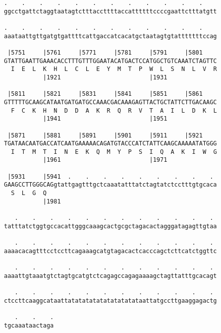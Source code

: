 \documentclass{article}
\begin{document}
\begin{Verbatim}
.    .    .    .    .    .    .    .    .    .    .    .    
ggcctgattctaggtaatagtctttaccttttaccattttttccccgaattctttatgtt
                                                            
.    .    .    .    .    .    .    .    .    .    .    .    
aaataattgttgatgtgattttcattgaccatcacatgctaatagtgtatttttttccag
                                                            
 |5751     |5761     |5771     |5781     |5791     |5801    
GTATTGAATTGAAACACCTTTGTTTGGAATACATGACTCCATGGCTGTCAAATCTAGTTC
  I  E  L  K  H  L  C  L  E  Y  M  T  P  W  L  S  N  L  V  R
           |1921                         |1931              
  
 |5811     |5821     |5831     |5841     |5851     |5861    
GTTTTTGCAAGCATAATGATGATGCCAAACGACAAAGAGTTACTGCTATTCTTGACAAGC
  F  C  K  H  N  D  D  A  K  R  Q  R  V  T  A  I  L  D  K  L
           |1941                         |1951              
  
 |5871     |5881     |5891     |5901     |5911     |5921    
TGATAACAATGACCATCAATGAAAAACAGATGTACCCATCTATTCAAGCAAAAATATGGG
  I  T  M  T  I  N  E  K  Q  M  Y  P  S  I  Q  A  K  I  W  G
           |1961                         |1971              
  
 |5931     |5941  .    .    .    .    .    .    .    .    . 
GAAGCCTTGGGCAGgtattgagtttgctcaaatatttatctagtatctcctttgtgcaca
  S  L  G  Q                                                
           |1981                                            
  
   .    .    .    .    .    .    .    .    .    .    .    . 
tatttatctggtgccacattgggcaaagcactgcgctagacactagggatagagttgtaa
                                                            
   .    .    .    .    .    .    .    .    .    .    .    . 
aaaacacagtttcctccttcagaaagcatgtagacactcacccagctcttcatctggttc
                                                            
   .    .    .    .    .    .    .    .    .    .    .    . 
aaaattgtaaatgtctagtgcatgtctcagagccagagaaaagctagttatttgcacagt
                                                            
   .    .    .    .    .    .    .    .    .    .    .    . 
ctccttcaaggcataattatatatatatatatatatataattatgccttgaaggagactg
                                                            
   .    .    .
tgcaaataactaga
              
              
 

\end{Verbatim}
\end{document}
